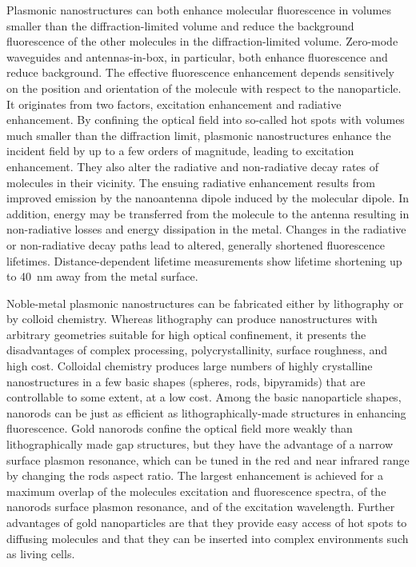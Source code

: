 Plasmonic nanostructures can both enhance molecular fluorescence in volumes smaller than the diffraction-limited volume and reduce the background fluorescence of the other molecules in the diffraction-limited volume.
Zero-mode waveguides and antennas-in-box, in particular, both enhance fluorescence and reduce background.\cite{levene2003zeromode,kinkhabwala2012fluorescence,punj2013a,yuan2013thousandfold,punj2013gold} 
The effective fluorescence enhancement depends sensitively on the position and orientation of the molecule with respect to the nanoparticle.
It originates from two factors, excitation enhancement and radiative enhancement.
By confining the optical field into so-called hot spots with volumes much smaller than the diffraction limit,\cite{schuller2010plasmonics} plasmonic nanostructures enhance the incident field by up to a few orders of magnitude, leading to excitation enhancement.\cite{yuan2013thousandfold,anger2006enhancement,kinkhabwala2009large,
acuna2012fluorescence,busson2012accelerated,holzmeister2014quantum,khatua2014resonant}
They also alter the radiative and non-radiative decay rates of molecules in their vicinity.
The ensuing radiative enhancement results from improved emission by the nanoantenna dipole induced by the molecular dipole.
In addition, energy may be transferred from the molecule to the antenna resulting in non-radiative losses and energy dissipation in the metal.
Changes in the radiative or non-radiative decay paths lead to altered, generally shortened fluorescence lifetimes.\cite{khatua2014resonant,liu2007quantized,lakowicz2001radiative,dulkeith2005gold,seelig2007nanoparticleinduced,muskens2007strong,pelton2015modified}
Distance-dependent lifetime measurements show lifetime shortening up to \SI{40}{\nm} away from the metal surface.\cite{seelig2007nanoparticleinduced}


Noble-metal plasmonic nanostructures can be fabricated either by lithography or by colloid chemistry.\cite{zijlstra2011single}
Whereas lithography can produce nanostructures with arbitrary geometries suitable for high optical confinement, it presents the disadvantages of complex processing, polycrystallinity, surface roughness, and high cost.
Colloidal chemistry produces large numbers of highly crystalline nanostructures in a few basic shapes (spheres, rods, bipyramids) that are controllable to some extent, at a low cost. 
Among the basic nanoparticle shapes, nanorods\cite{yuan2013thousandfold} can be just as efficient as lithographically-made structures\cite{punj2013a,kinkhabwala2009large} in enhancing fluorescence.
Gold nanorods confine the optical field more weakly than lithographically made gap structures, but they have the advantage of a narrow surface plasmon resonance, which can be tuned in the red and near infrared range by changing the rod\textquotesingle s aspect ratio.\cite{khatua2014resonant}
The largest enhancement is achieved for a maximum overlap of the molecule\textquotesingle s excitation and fluorescence spectra, of the nanorod\textquotesingle s surface plasmon resonance, and of the excitation wavelength.
Further advantages of gold nanoparticles are that they provide easy access of hot spots to diffusing molecules and that they can be inserted into complex environments such as living cells.

